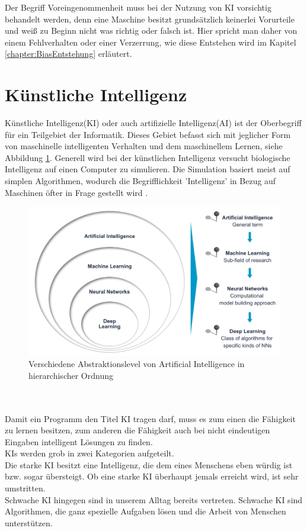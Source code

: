 \documentclass[12pt,oneside,a4paper,parskip]{scrbook}
\begin{document}
Der Begriff Voreingenommenheit muss bei der Nutzung von KI vorsichtig behandelt werden, denn eine Maschine besitzt grundsätzlich keinerlei Vorurteile und weiß zu Beginn nicht was richtig oder falsch ist. Hier spricht man daher von einem Fehlverhalten oder einer Verzerrung, wie diese Entstehen wird im Kapitel \ref{chapter:BiasEntstehung} erläutert.
\section{Künstliche Intelligenz}
Künstliche Intelligenz(KI) oder auch artifizielle Intelligenz(AI) ist der Oberbegriff für ein Teilgebiet der Informatik. Dieses Gebiet befasst sich mit jeglicher Form von maschinelle intelligenten Verhalten und dem maschinellem Lernen, siehe Abbildung \ref{fig:Uebersicht}. Generell wird bei der künstlichen Intelligenz versucht biologische Intelligenz auf einen Computer zu simulieren. Die Simulation basiert meist auf simplen Algorithmen, wodurch die Begrifflichkeit 'Intelligenz' in Bezug auf Maschinen öfter in Frage gestellt wird \cite{Grundlagen}.
\begin{figure}[ht]
	\begin{center}
		\includegraphics[width=14cm]{Bilder/Abstraktionslevel_von_AI.jpg}
		\caption{Verschiedene Abstraktionslevel von Artificial Intelligence in hierarchischer Ordnung\cite{dataScience}}
		\label{fig:Uebersicht}
	\end{center}
\end{figure}
\\\\Damit ein Programm den Titel KI tragen darf, muss es zum einen die Fähigkeit zu lernen besitzen, zum anderen die Fähigkeit auch bei nicht eindeutigen Eingaben intelligent Lösungen zu finden.\\
KIs werden grob in zwei Kategorien aufgeteilt.\\
Die starke KI besitzt eine Intelligenz, die dem eines Menschens eben würdig ist bzw. sogar übersteigt. Ob eine starke KI überhaupt jemals erreicht wird, ist sehr umstritten. \\Schwache KI hingegen sind in unserem Alltag bereits vertreten. Schwache KI sind Algorithmen, die ganz spezielle Aufgaben lösen und die Arbeit von Menschen unterstützen.
\end{document}
